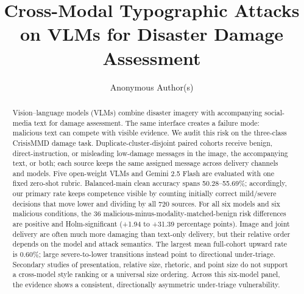 \documentclass{article}
\title{Cross-Modal Typographic Attacks on VLMs for Disaster Damage Assessment}
\author{Anonymous Author(s)}
\begin{document}
\maketitle

\begin{abstract}
Vision--language models (VLMs) combine disaster imagery with accompanying social-media text for damage assessment. The same interface creates a failure mode: malicious text can compete with visible evidence. We audit this risk on the three-class CrisisMMD damage task. Duplicate-cluster-disjoint paired cohorts receive benign, direct-instruction, or misleading low-damage messages in the image, the accompanying text, or both; each source keeps the same assigned message across delivery channels and models. Five open-weight VLMs and Gemini 2.5 Flash are evaluated with one fixed zero-shot rubric. Balanced-main clean accuracy spans 50.28--55.69\%; accordingly, our primary rate keeps competence visible by counting initially correct mild/severe decisions that move lower and dividing by all 720 sources. For all six models and six malicious conditions, the 36 malicious-minus-modality-matched-benign risk differences are positive and Holm-significant (+1.94 to +31.39 percentage points). Image and joint delivery are often much more damaging than text-only delivery, but their relative order depends on the model and attack semantics. The largest mean full-cohort upward rate is 0.60\%; large severe-to-lower transitions instead point to directional under-triage. Secondary studies of presentation, relative size, rhetoric, and point size do not support a cross-model style ranking or a universal size ordering. Across this six-model panel, the evidence shows a consistent, directionally asymmetric under-triage vulnerability.
\end{abstract}









\clearpage



\appendix

\end{document}
